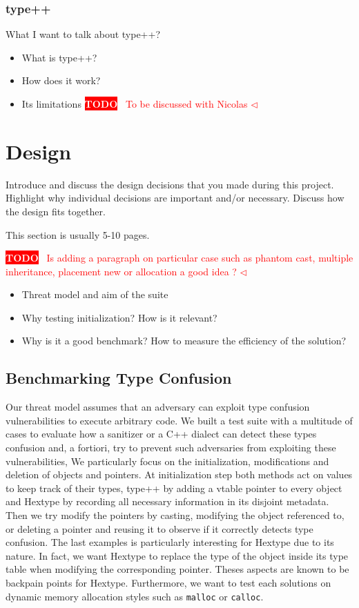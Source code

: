 \documentclass[a4paper,11pt,oneside]{report}
\newcommand{\todobox}[3]{%
       \colorbox{#1}{\textcolor{white}{\sffamily\bfseries\scriptsize #2}}%
       ~\textcolor{#1}{#3} %
       \textcolor{#1}{$\triangleleft$}%
}
\newcommand{\adrbqt}[1]{\todobox{red}{TODO}{#1}}
\begin{document}
\subsection{type++}

What I want to talk about type++?
\begin{itemize}
       \item What is type++?
       \item How does it work?
       \item Its limitations \adrbqt{To be discussed with Nicolas}
\end{itemize}


\chapter{Design}

Introduce and discuss the design decisions that you made during this project.
Highlight why individual decisions are important and/or necessary. Discuss
how the design fits together.

This section is usually 5-10 pages.

\adrbqt{Is adding a paragraph on particular case such as phantom cast, multiple inheritance, placement new or allocation a good idea ?}

\begin{itemize}
       \item Threat model and aim of the suite 
       \item Why testing initialization? How is it relevant?
       \item Why is it a good benchmark? How to measure the efficiency of the solution?

\end{itemize}

\section{Benchmarking Type Confusion}

Our threat model assumes that an adversary can exploit type confusion vulnerabilities to execute arbitrary code. 
We built a test suite with a multitude of cases to evaluate how a sanitizer or a C++ dialect can detect these types confusion and, 
a fortiori, try to prevent such adversaries from exploiting these vulnerabilities,
We particularly focus on the initialization, modifications and deletion of objects and pointers. At initialization step 
both methods act on values to keep track of their types, type++ by adding a vtable pointer to every object and Hextype by recording all necessary 
information in its disjoint metadata. Then we try modify the pointers by casting, modifying the object referenced to, 
or deleting a pointer and reusing it to observe if it correctly detects type confusion. The last examples is particularly interesting
for Hextype due to its nature. In fact, we want Hextype to replace the type of the object inside its type table when modifying 
the corresponding pointer. Theses aspects are known to be backpain points for Hextype. Furthermore, we want to test each solutions
on dynamic memory allocation styles such as \texttt{malloc} or \texttt{calloc}. 
\end{document}
